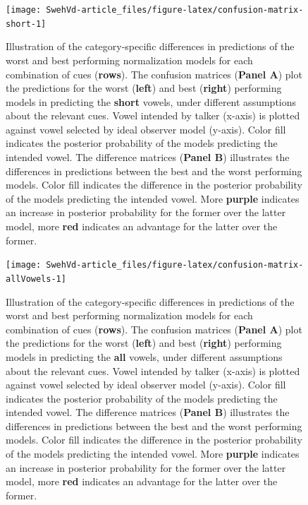 \documentclass[utf8]{frontiersSCNS}
\begin{document}
\begin{landscape}

\begin{figure}

{\centering \texttt{[image: SwehVd-article\_files/figure-latex/confusion-matrix-short-1]} 

}

\caption{Illustration of the category-specific differences in predictions of the worst and best performing normalization models for each combination of cues (\textbf{rows}). The confusion matrices (\textbf{Panel A}) plot the predictions for the worst (\textbf{left}) and best (\textbf{right}) performing models in predicting the \textbf{short} vowels, under different assumptions about the relevant cues. Vowel intended by talker (x-axis) is plotted against vowel selected by ideal observer model (y-axis). Color fill indicates the posterior probability of the models predicting the intended vowel. The difference matrices (\textbf{Panel B}) illustrates the differences in predictions between the best and the worst performing models. Color fill indicates the difference in the posterior probability of the models predicting the intended vowel. More \textbf{purple} indicates an increase in posterior probability for the former over the latter model, more \textbf{red} indicates an advantage for the latter over the former.}\label{fig:confusion-matrix-short}
\end{figure}

\end{landscape}



\begin{landscape}

\begin{figure}

{\centering \texttt{[image: SwehVd-article\_files/figure-latex/confusion-matrix-allVowels-1]} 

}

\caption{Illustration of the category-specific differences in predictions of the worst and best performing normalization models for each combination of cues (\textbf{rows}). The confusion matrices (\textbf{Panel A}) plot the predictions for the worst (\textbf{left}) and best (\textbf{right}) performing models in predicting the \textbf{all} vowels, under different assumptions about the relevant cues. Vowel intended by talker (x-axis) is plotted against vowel selected by ideal observer model (y-axis). Color fill indicates the posterior probability of the models predicting the intended vowel. The difference matrices (\textbf{Panel B}) illustrates the differences in predictions between the best and the worst performing models. Color fill indicates the difference in the posterior probability of the models predicting the intended vowel. More \textbf{purple} indicates an increase in posterior probability for the former over the latter model, more \textbf{red} indicates an advantage for the latter over the former.}\label{fig:confusion-matrix-allVowels}
\end{figure}

\end{landscape}
\end{document}

